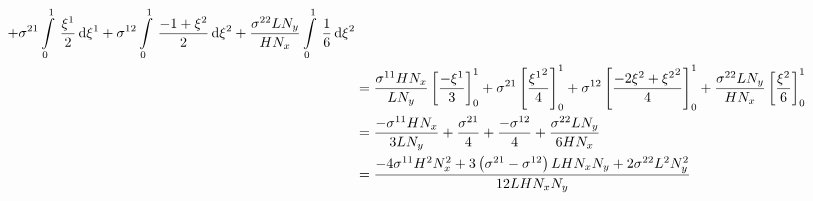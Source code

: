 \begin{equation}
\begin{aligned}
    +\conductivitytensorsymbol^{21}\gint{0}{1}{\dfrac{\xione}{2}}{\xione}
    +\conductivitytensorsymbol^{12}\gint{0}{1}{\dfrac{-1+\xitwo}{2}}{\xitwo}
    +\dfrac{\conductivitytensorsymbol^{22} L N_{y}}{H N_{x}}\gint{0}{1}{\dfrac{1}{6}}{\xitwo} \\
    &=\dfrac{\conductivitytensorsymbol^{11} H N_{x}}{L N_{y}}\sqbrac{\dfrac{-\xione}{3}}^{1}_{0}
    +\conductivitytensorsymbol^{21}\sqbrac{\dfrac{\xionesq}{4}}^{1}_{0}
    +\conductivitytensorsymbol^{12}\sqbrac{\dfrac{-2\xitwo+\xitwosq}{4}}^{1}_{0}
    +\dfrac{\conductivitytensorsymbol^{22} L N_{y}}{H N_{x}}\sqbrac{\dfrac{\xitwo}{6}}^{1}_{0} \\
    &=\dfrac{-\conductivitytensorsymbol^{11} H N_{x}}{3 L N_{y}}+\dfrac{\conductivitytensorsymbol^{21}}{4}+
    \dfrac{-\conductivitytensorsymbol^{12}}{4}+\dfrac{\conductivitytensorsymbol^{22} L N_{y}}{6 H N_{x}} \\
    &=\dfrac{-4\conductivitytensorsymbol^{11}H^{2}N_{x}^{2}+3\pbrac{\conductivitytensorsymbol^{21}-
        \conductivitytensorsymbol^{12}}L H N_{x} N_{y}+2\conductivitytensorsymbol^{22}L^{2}N_{y}^{2}}{12 L H N_{x} N_{y}}
  \end{aligned}
\end{equation}

